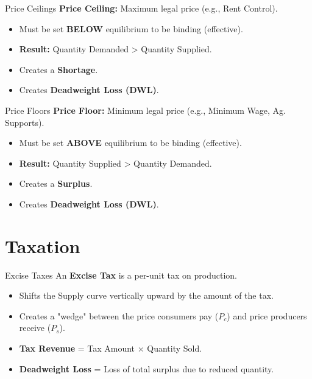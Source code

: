 \documentclass[aspectratio=169]{beamer}
\begin{document}
\begin{frame}{Price Ceilings}
    \textbf{Price Ceiling:} Maximum legal price (e.g., Rent Control).
    \begin{itemize}
        \item Must be set \textbf{BELOW} equilibrium to be binding (effective).
        \item \textbf{Result:} Quantity Demanded > Quantity Supplied.
        \item Creates a \textbf{Shortage}.
        \item Creates \textbf{Deadweight Loss (DWL)}.
    \end{itemize}
\end{frame}

\begin{frame}{Price Floors}
    \textbf{Price Floor:} Minimum legal price (e.g., Minimum Wage, Ag. Supports).
    \begin{itemize}
        \item Must be set \textbf{ABOVE} equilibrium to be binding (effective).
        \item \textbf{Result:} Quantity Supplied > Quantity Demanded.
        \item Creates a \textbf{Surplus}.
        \item Creates \textbf{Deadweight Loss (DWL)}.
    \end{itemize}
\end{frame}

\section{Taxation}

\begin{frame}{Excise Taxes}
    An \textbf{Excise Tax} is a per-unit tax on production.
    \begin{itemize}
        \item Shifts the Supply curve vertically upward by the amount of the tax.
        \item Creates a "wedge" between the price consumers pay ($P_c$) and price producers receive ($P_s$).
        \item \textbf{Tax Revenue} = Tax Amount $\times$ Quantity Sold.
        \item \textbf{Deadweight Loss} = Loss of total surplus due to reduced quantity.
    \end{itemize}
\end{frame}
\end{document}
